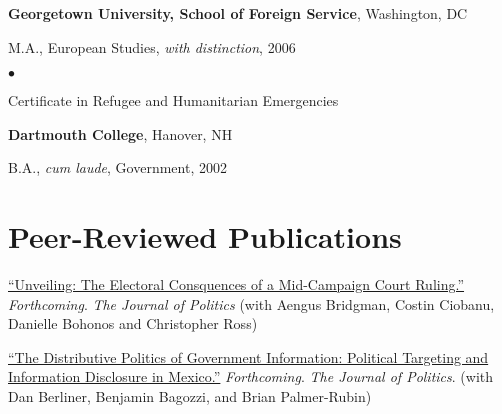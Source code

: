 \documentclass[margin,line]{res}
\newenvironment{list1}{
  \begin{list}{\ding{113}}{%
      \setlength{\itemsep}{0in}
      \setlength{\parsep}{0in} \setlength{\parskip}{0in}
      \setlength{\topsep}{0in} \setlength{\partopsep}{0in} 
      \setlength{\leftmargin}{0.17in}}}{\end{list}}
\newenvironment{list2}{
  \begin{list}{$\bullet$}{%
      \setlength{\itemsep}{0in}
      \setlength{\parsep}{0in} \setlength{\parskip}{0in}
      \setlength{\topsep}{0in} \setlength{\partopsep}{0in} 
      \setlength{\leftmargin}{0.2in}}}{\end{list}}
\begin{document}
{\begin{resume}
{\bf Georgetown University, School of Foreign Service}, Washington, DC 
\begin{list1}
\item[] M.A., European Studies, \emph{with distinction},  2006
  \begin{list2}
\item[] Certificate in Refugee and Humanitarian Emergencies

\end{list2}
\end{list1}

{\bf Dartmouth College}, Hanover, NH
\begin{list1}
\item[] B.A., \emph{cum laude}, Government,  2002
\end{list1}



\section{\sc Peer-Reviewed Publications}
\renewcommand{\labelenumi}{\theenumi.}
\begin{etaremune}

\item \href{http://www.aaronerlich.com/wp-content/uploads/2020/05/CAN2015_Niqab.pdf}{``Unveiling: The Electoral Consquences of a Mid-Campaign Court
  Ruling.''} \emph{Forthcoming}. \textit{The
  Journal of Politics} (with Aengus Bridgman, Costin Ciobanu, Danielle
Bohonos and Christopher Ross)

\item  \href{https://doi.org/10.1086/709148}{``The Distributive Politics of Government Information: Political
  Targeting and Information Disclosure in Mexico.''} \emph{Forthcoming}.
  \emph{The Journal of Politics}. (with Dan Berliner, Benjamin Bagozzi,
and Brian Palmer-Rubin)
  

\end{etaremune}
\end{resume}}
\end{document}
